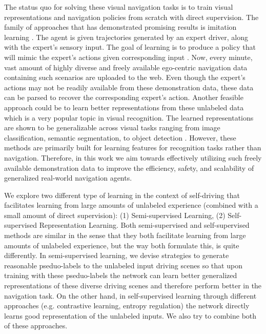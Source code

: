 \documentclass[12pt, letterpaper,cleardoubleempty,BCOR1cm]{scrbook}
\begin{document}
The status quo for solving these visual navigation tasks is to train visual
representations and navigation policies from scratch with direct supervision.
The family of approaches that has demonstrated promising results is imitation
learning \cite{Chen2019,Codevilla2017}. The agent is given trajectories
generated by an expert driver, along with the expert's sensory input. The goal
of learning is to produce a policy that will mimic the expert’s actions given
corresponding input
\cite{article,Bojarski2016,7410669,chen2021learning,Gupta2017,Hawke2019,Li2018,Liang2018,Mueller2018,inproceedings,Osa2018,Pomerleau1988,Prakash2021,Zhang2021}.
Now, every minute, vast amount of highly diverse and freely available
ego-centric navigation data containing such scenarios are uploaded to the
web. Even though the expert's actions may not be readily available from these
demonstration data, these data can be parsed to recover the corresponding
expert's action.  Another feasible approach could be to learn better
representations from these unlabeled data which is a very popular topic in
visual recognition. The learned representations are shown to be generalizable
across visual tasks ranging from image classification, semantic segmentation, to
object detection \cite{Chen2020a,Grill2020,He2019,Caron2020,Caron2021}. However,
these methods are primarily built for learning features for recognition tasks
rather than navigation. Therefore, in this work we aim towards effectively
utilizing such freely available demonstration data to improve the efficiency,
safety, and scalability of generalized real-world navigation agents.

We explore two different type of learning in the context of self-driving that
facilitates learning from large amounts of unlabeled experience (combined with a
small amount of direct supervision): (1) Semi-supervised Learning, (2)
Self-supervised Representation Learning. Both semi-supervised and
self-supervised methods are similar in the sense that they both facilitate
learning from large amounts of unlabeled experience, but the way both formulate
this, is quite differently. In semi-supervised learning, we devise strategies to
generate reasonable pseduo-labels to the unlabeled input driving scenes so that
upon training with these pseduo-labels the network can learn better generalized
representations of these diverse driving scenes and therefore perform better in
the navigation task. On the other hand, in self-supervised learning through
different approaches (e.g. contrastive learning, entropy regulation) the network
directly learns good representation of the unlabeled inputs. We also try to
combine both of these approaches.
\end{document}
